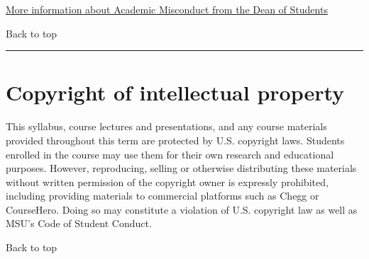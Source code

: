 \documentclass[
]{article}
\begin{document}
\href{https://www.montana.edu/deanofstudents/academicmisconduct/academicmisconduct.html}{More
information about Academic Misconduct from the Dean of Students}

Back to top

\begin{center}\rule{0.5\linewidth}{0.5pt}\end{center}

\section{Copyright of intellectual
property}\label{copyright-of-intellectual-property}

This syllabus, course lectures and presentations, and any course
materials provided throughout this term are protected by U.S. copyright
laws. Students enrolled in the course may use them for their own
research and educational purposes. However, reproducing, selling or
otherwise distributing these materials without written permission of the
copyright owner is expressly prohibited, including providing materials
to commercial platforms such as Chegg or CourseHero. Doing so may
constitute a violation of U.S. copyright law as well as MSU's Code of
Student Conduct.

Back to top
\end{document}
